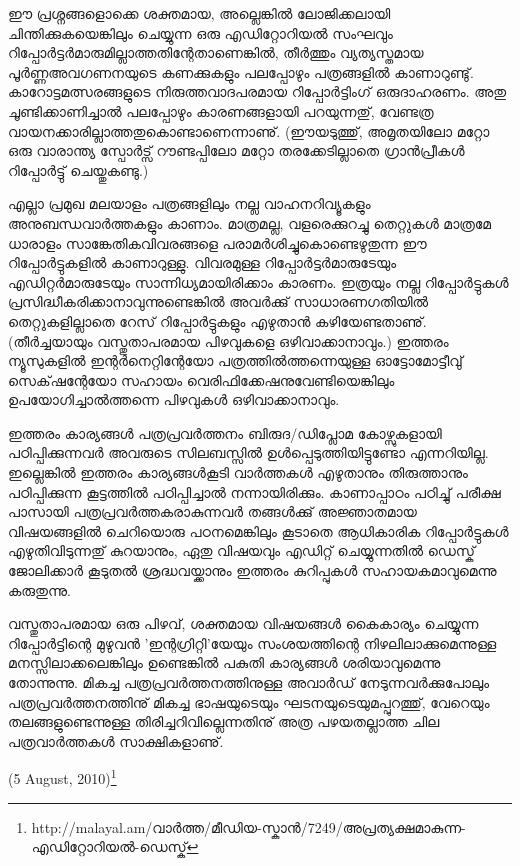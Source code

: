 ഈ പ്രശ്നങ്ങളൊക്കെ ശക്തമായ, അല്ലെങ്കില്‍ ലോജിക്കലായി ചിന്തിക്കുകയെങ്കിലും ചെയ്യുന്ന ഒരു എഡിറ്റോറിയല്‍ 
സംഘവും റിപ്പോര്‍ട്ടര്‍മാരുമില്ലാത്തതിന്റേതാണെങ്കില്‍, തീര്‍ത്തും വ്യത്യസ്തമായ പൂര്‍ണ്ണഅവഗണനയുടെ കണക്കുകളും 
പലപ്പോഴും പത്രങ്ങളില്‍ കാണാറുണ്ടു്. കാറോട്ടമത്സരങ്ങളുടെ നിരുത്തവാദപരമായ റിപ്പോര്‍ട്ടിംഗ് ഒരുദാഹരണം. അതു 
ചൂണ്ടിക്കാണിച്ചാല്‍ പലപ്പോഴും കാരണങ്ങളായി പറയുന്നതു്, വേണ്ടത്ര വായനക്കാരില്ലാത്തതുകൊണ്ടാണെന്നാണു്. 
(ഈയടുത്തു്, അമൃതയിലോ മറ്റോ ഒരു വാരാന്ത്യ സ്പോര്‍ട്സ് റൗണ്ടപ്പിലോ മറ്റോ തരക്കേടില്ലാതെ ഗ്രാന്‍പ്രീകള്‍ 
റിപ്പോര്‍ട്ടു് ചെയ്തുകണ്ടു.)

എല്ലാ പ്രമുഖ മലയാളം പത്രങ്ങളിലും നല്ല വാഹനറിവ്യൂകളും അനുബന്ധവാര്‍ത്തകളും കാണാം. മാത്രമല്ല, വളരെക്കുറച്ചു 
തെറ്റുകള്‍ മാത്രമേ ധാരാളം സാങ്കേതികവിവരങ്ങളെ പരാമര്‍ശിച്ചുകൊണ്ടെഴുതുന്ന ഈ റിപ്പോര്‍ട്ടുകളില്‍ കാണാറുള്ളു. 
വിവരമുള്ള റിപ്പോര്‍ട്ടര്‍മാരുടേയും എഡിറ്റര്‍മാരുടേയും സാന്നിധ്യമായിരിക്കാം കാരണം. ഇത്രയും നല്ല റിപ്പോര്‍ട്ടുകള്‍ 
പ്രസിദ്ധീകരിക്കാനാവുന്നുണ്ടെങ്കില്‍ അവര്‍ക്കു് സാധാരണഗതിയില്‍ തെറ്റുകളില്ലാതെ റേസ് റിപ്പോര്‍ട്ടുകളും എഴുതാന്‍ 
കഴിയേണ്ടതാണു്. (തീര്‍ച്ചയായും വസ്തുതാപരമായ പിഴവുകളെ ഒഴിവാക്കാനാവും.) ഇത്തരം ന്യൂസുകളില്‍ ഇന്റര്‍നെറ്റിന്റേയോ പത്രത്തില്‍ത്തന്നെയുള്ള 
ഓട്ടോമോട്ടീവു് സെക്‌ഷന്റേയോ സഹായം വെരിഫിക്കേഷനുവേണ്ടിയെങ്കിലും ഉപയോഗിച്ചാല്‍ത്തന്നെ പിഴവുകള്‍ 
ഒഴിവാക്കാനാവും.

ഇത്തരം കാര്യങ്ങള്‍ പത്രപ്രവര്‍ത്തനം ബിരുദ/ഡിപ്ലോമ കോഴ്സുകളായി പഠിപ്പിക്കുന്നവര്‍ അവരുടെ സിലബസ്സില്‍ 
ഉള്‍പ്പെടുത്തിയിട്ടുണ്ടോ എന്നറിയില്ല. ഇല്ലെങ്കില്‍ ഇത്തരം കാര്യങ്ങള്‍കൂടി വാര്‍ത്തകള്‍ എഴുതാനും തിരുത്താനും 
പഠിപ്പിക്കുന്ന കൂട്ടത്തില്‍ പഠിപ്പിച്ചാല്‍ നന്നായിരിക്കും. കാണാപ്പാഠം പഠിച്ചു് പരീക്ഷ പാസായി പത്രപ്രവര്‍ത്തകരാകുന്നവര്‍
തങ്ങള്‍ക്കു് അജ്ഞാതമായ വിഷയങ്ങളില്‍ ചെറിയൊരു പഠനമെങ്കിലും കൂടാതെ ആധികാരിക റിപ്പോര്‍ട്ടുകള്‍ 
എഴുതിവിടുന്നതു് കുറയാനും, ഏതു വിഷയവും എഡിറ്റ് ചെയ്യുന്നതില്‍ ഡെസ്ക് ജോലിക്കാര്‍ കൂടുതല്‍ ശ്രദ്ധവയ്ക്കാനും 
ഇത്തരം കുറിപ്പുകള്‍ സഹായകമാവുമെന്നു കരുതുന്നു.

വസ്തുതാപരമായ ഒരു പിഴവ്, ശക്തമായ വിഷയങ്ങള്‍ കൈകാര്യം ചെയ്യുന്ന റിപ്പോര്‍ട്ടിന്റെ മുഴുവന്‍ 'ഇന്റഗ്രിറ്റി'യേയും 
സംശയത്തിന്റെ നിഴലിലാക്കുമെന്നുള്ള മനസ്സിലാക്കലെങ്കിലും ഉണ്ടെങ്കില്‍ പകുതി കാര്യങ്ങള്‍ ശരിയാവുമെന്നു തോന്നുന്നു. 
മികച്ച പത്രപ്രവര്‍ത്തനത്തിനുള്ള അവാര്‍ഡ് നേടുന്നവര്‍ക്കുപോലും പത്രപ്രവര്‍ത്തനത്തിനു് മികച്ച ഭാഷയുടെയും 
ഘടനയുടെയുമപ്പുറത്തു്, വേറെയും തലങ്ങളുണ്ടെന്നുള്ള തിരിച്ചറിവില്ലെന്നതിനു് അത്ര പഴയതല്ലാത്ത ചില 
പത്രവാര്‍ത്തകള്‍ സാക്ഷികളാണു്.

\begin{flushright}(5 August, 2010)\footnote{http://malayal.am/വാര്‍ത്ത/മീഡിയ-സ്കാന്‍/7249/അപ്രത്യക്ഷമാകുന്ന-എഡിറ്റോറിയല്‍-ഡെസ്ക്}\end{flushright}

\newpage
